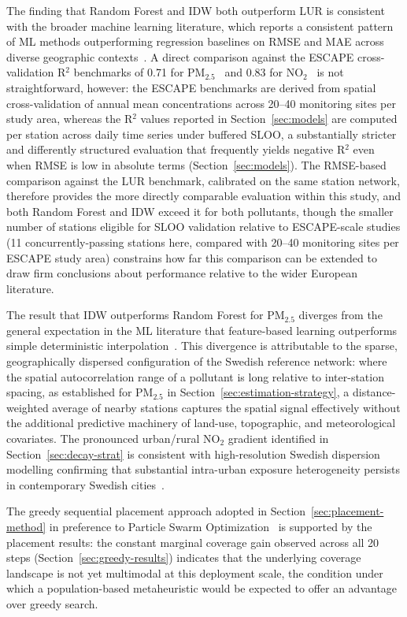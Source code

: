 \documentclass[11pt,a4paper]{article}
\begin{document}
The finding that Random Forest and IDW both outperform LUR is consistent with the broader machine learning literature, which reports a consistent pattern of ML methods outperforming regression baselines on RMSE and MAE across diverse geographic contexts~\cite{agbehadji_ml_aq_review_2024}. A direct comparison against the ESCAPE cross-validation R$^2$ benchmarks of 0.71 for PM$_{2.5}$~\cite{eeftens_escape_pm_2012} and 0.83 for NO$_2$~\cite{wang_escape_no2_2013} is not straightforward, however: the ESCAPE benchmarks are derived from spatial cross-validation of annual mean concentrations across 20--40 monitoring sites per study area, whereas the R$^2$ values reported in Section~\ref{sec:models} are computed per station across daily time series under buffered SLOO, a substantially stricter and differently structured evaluation that frequently yields negative R$^2$ even when RMSE is low in absolute terms (Section~\ref{sec:models}). The RMSE-based comparison against the LUR benchmark, calibrated on the same station network, therefore provides the more directly comparable evaluation within this study, and both Random Forest and IDW exceed it for both pollutants, though the smaller number of stations eligible for SLOO validation relative to ESCAPE-scale studies (11 concurrently-passing stations here, compared with 20--40 monitoring sites per ESCAPE study area) constrains how far this comparison can be extended to draw firm conclusions about performance relative to the wider European literature.

The result that IDW outperforms Random Forest for PM$_{2.5}$ diverges from the general expectation in the ML literature that feature-based learning outperforms simple deterministic interpolation~\cite{chen_pm25_interpolation_2021}. This divergence is attributable to the sparse, geographically dispersed configuration of the Swedish reference network: where the spatial autocorrelation range of a pollutant is long relative to inter-station spacing, as established for PM$_{2.5}$ in Section~\ref{sec:estimation-strategy}, a distance-weighted average of nearby stations captures the spatial signal effectively without the additional predictive machinery of land-use, topographic, and meteorological covariates. The pronounced urban/rural NO$_2$ gradient identified in Section~\ref{sec:decay-strat} is consistent with high-resolution Swedish dispersion modelling confirming that substantial intra-urban exposure heterogeneity persists in contemporary Swedish cities~\cite{sweden_dispersion_2024}.

The greedy sequential placement approach adopted in Section~\ref{sec:placement-method} in preference to Particle Swarm Optimization~\cite{gupta_pso_placement_2023, pso_node_deployment_2024} is supported by the placement results: the constant marginal coverage gain observed across all 20 steps (Section~\ref{sec:greedy-results}) indicates that the underlying coverage landscape is not yet multimodal at this deployment scale, the condition under which a population-based metaheuristic would be expected to offer an advantage over greedy search.
\end{document}
